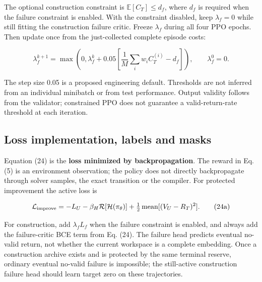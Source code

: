 \documentclass[10pt,a4paper]{article}
\begin{document}
The optional construction constraint is \(\mathbb E[C_T]\le d_f\), where
\(d_f\) is required when the failure constraint is enabled. With the
constraint disabled, keep \(\lambda_f=0\) while still fitting the
construction failure critic. Freeze \(\lambda_f\) during all four PPO
epochs. Then update once from the just-collected complete episode costs:

\[
\lambda_f^{k+1}=\max\left(0,\lambda_f^k+0.05
\left[\frac1M\sum_iw_iC_T^{(i)}-d_f\right]\right),
\qquad\lambda_f^0=0.
\tag{25}
\]

The step size 0.05 is a proposed engineering default. Thresholds are not
inferred from an individual minibatch or from test performance. Output
validity follows from the validator; constrained PPO does not guarantee
a valid-return-rate threshold at each iteration.

\hypertarget{loss-implementation-labels-and-masks}{%
\subsection{Loss implementation, labels and
masks}\label{loss-implementation-labels-and-masks}}

Equation (24) is the \textbf{loss minimized by backpropagation}. The
reward in Eq. (5) is an environment observation; the policy does not
directly backpropagate through solver samples, the exact transition or
the compiler. For protected improvement the active loss is

\[
\mathcal L_{\rm improve}=-L_U-\beta_H\mathcal R[\mathcal H(\pi_\theta)]
+\tfrac12\operatorname{mean}[(V_U-R_T)^2].
\tag{24a}
\]

For construction, add \(\lambda_fL_f\) when the failure constraint is
enabled, and always add the failure-critic BCE term from Eq. (24). The
failure head predicts eventual no-valid return, not whether the current
workspace is a complete embedding. Once a construction archive exists
and is protected by the same terminal reserve, ordinary eventual
no-valid failure is impossible; the still-active construction failure
head should learn target zero on these trajectories.

\begingroup\small
\end{document}
